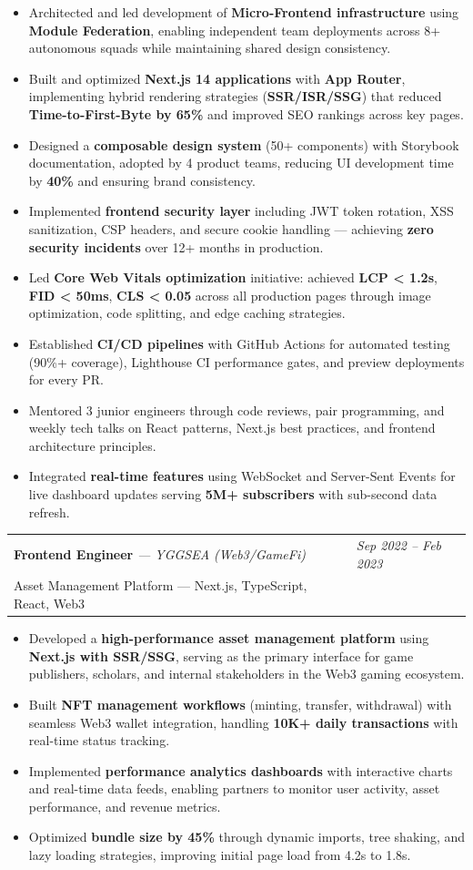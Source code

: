 \documentclass[a4paper,11pt]{article}
\newcommand{\resumeSubheading}[4]{
  \vspace{-1pt}\noindent
  \begin{tabularx}{\textwidth}{X >{\raggedleft\arraybackslash}p{4.2cm}}
    \textbf{#1} \textit{\small --- #2} & \textit{\small #3} \\
    \small #4 & \\
  \end{tabularx}\vspace{-6pt}
}
\newcommand{\resumeItemListStart}{\begin{itemize}[leftmargin=0.2in, label=\textbullet, itemsep=1pt, parsep=0pt]}
\newcommand{\resumeItemListEnd}{\end{itemize}\vspace{-4pt}}
\newcommand{\resumeItem}[1]{\item\small{#1}}
\begin{document}
\resumeItemListStart
  \resumeItem{Architected and led development of \textbf{Micro-Frontend infrastructure} using \textbf{Module Federation}, enabling independent team deployments across 8+ autonomous squads while maintaining shared design consistency.}
  \resumeItem{Built and optimized \textbf{Next.js 14 applications} with \textbf{App Router}, implementing hybrid rendering strategies (\textbf{SSR/ISR/SSG}) that reduced \textbf{Time-to-First-Byte by 65\%} and improved SEO rankings across key pages.}
  \resumeItem{Designed a \textbf{composable design system} (50+ components) with Storybook documentation, adopted by 4 product teams, reducing UI development time by \textbf{40\%} and ensuring brand consistency.}
  \resumeItem{Implemented \textbf{frontend security layer} including JWT token rotation, XSS sanitization, CSP headers, and secure cookie handling --- achieving \textbf{zero security incidents} over 12+ months in production.}
  \resumeItem{Led \textbf{Core Web Vitals optimization} initiative: achieved \textbf{LCP < 1.2s}, \textbf{FID < 50ms}, \textbf{CLS < 0.05} across all production pages through image optimization, code splitting, and edge caching strategies.}
  \resumeItem{Established \textbf{CI/CD pipelines} with GitHub Actions for automated testing (90\%+ coverage), Lighthouse CI performance gates, and preview deployments for every PR.}
  \resumeItem{Mentored 3 junior engineers through code reviews, pair programming, and weekly tech talks on React patterns, Next.js best practices, and frontend architecture principles.}
  \resumeItem{Integrated \textbf{real-time features} using WebSocket and Server-Sent Events for live dashboard updates serving \textbf{5M+ subscribers} with sub-second data refresh.}
\resumeItemListEnd

\resumeSubheading
  {Frontend Engineer}{YGGSEA (Web3/GameFi)}{Sep 2022 -- Feb 2023}
  {Asset Management Platform --- Next.js, TypeScript, React, Web3}

\resumeItemListStart
  \resumeItem{Developed a \textbf{high-performance asset management platform} using \textbf{Next.js with SSR/SSG}, serving as the primary interface for game publishers, scholars, and internal stakeholders in the Web3 gaming ecosystem.}
  \resumeItem{Built \textbf{NFT management workflows} (minting, transfer, withdrawal) with seamless Web3 wallet integration, handling \textbf{10K+ daily transactions} with real-time status tracking.}
  \resumeItem{Implemented \textbf{performance analytics dashboards} with interactive charts and real-time data feeds, enabling partners to monitor user activity, asset performance, and revenue metrics.}
  \resumeItem{Optimized \textbf{bundle size by 45\%} through dynamic imports, tree shaking, and lazy loading strategies, improving initial page load from 4.2s to 1.8s.}
\resumeItemListEnd
\end{document}
